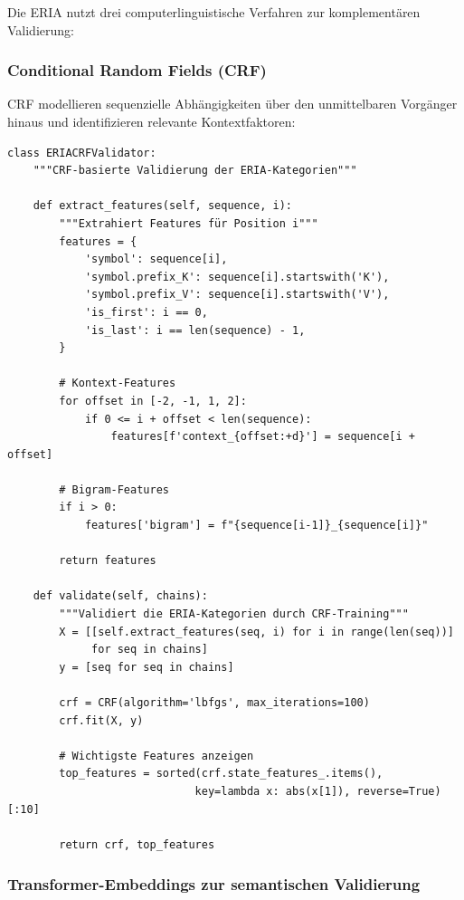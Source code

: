\documentclass[12pt,a4paper]{article}
\begin{document}
Die ERIA nutzt drei computerlinguistische Verfahren zur komplementären Validierung:

\subsubsection{Conditional Random Fields (CRF)}

CRF modellieren sequenzielle Abhängigkeiten über den unmittelbaren Vorgänger 
hinaus und identifizieren relevante Kontextfaktoren:

\begin{lstlisting}[caption=CRF-Validierung in ERIA]
class ERIACRFValidator:
    """CRF-basierte Validierung der ERIA-Kategorien"""
    
    def extract_features(self, sequence, i):
        """Extrahiert Features für Position i"""
        features = {
            'symbol': sequence[i],
            'symbol.prefix_K': sequence[i].startswith('K'),
            'symbol.prefix_V': sequence[i].startswith('V'),
            'is_first': i == 0,
            'is_last': i == len(sequence) - 1,
        }
        
        # Kontext-Features
        for offset in [-2, -1, 1, 2]:
            if 0 <= i + offset < len(sequence):
                features[f'context_{offset:+d}'] = sequence[i + offset]
        
        # Bigram-Features
        if i > 0:
            features['bigram'] = f"{sequence[i-1]}_{sequence[i]}"
        
        return features
    
    def validate(self, chains):
        """Validiert die ERIA-Kategorien durch CRF-Training"""
        X = [[self.extract_features(seq, i) for i in range(len(seq))] 
             for seq in chains]
        y = [seq for seq in chains]
        
        crf = CRF(algorithm='lbfgs', max_iterations=100)
        crf.fit(X, y)
        
        # Wichtigste Features anzeigen
        top_features = sorted(crf.state_features_.items(), 
                             key=lambda x: abs(x[1]), reverse=True)[:10]
        
        return crf, top_features
\end{lstlisting}

\subsubsection{Transformer-Embeddings zur semantischen Validierung}
\end{document}
